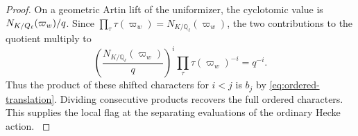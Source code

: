 \begin{proof}
On a geometric Artin lift of the uniformizer, the
cyclotomic value is \(N_{K/Q_\ell}(\varpi_w)/q\).
Since \(\prod_\tau\tau(\varpi_w)=N_{K/\mathbb Q_\ell}(\varpi_w)\),
the two contributions to the quotient multiply to
\[
 \left(\frac{N_{K/\mathbb Q_\ell}(\varpi_w)}{q}\right)^i
 \prod_\tau\tau(\varpi_w)^{-i}=q^{-i}.
\] Thus the product of these shifted
characters for \(i<j\) is \(b_j\) by
\eqref{eq:ordered-translation}. Dividing consecutive
products recovers the full ordered characters.
This supplies the local flag at the separating evaluations of the ordinary Hecke action. \label{cor:ordinary-level-attachments-2}
\end{proof}
